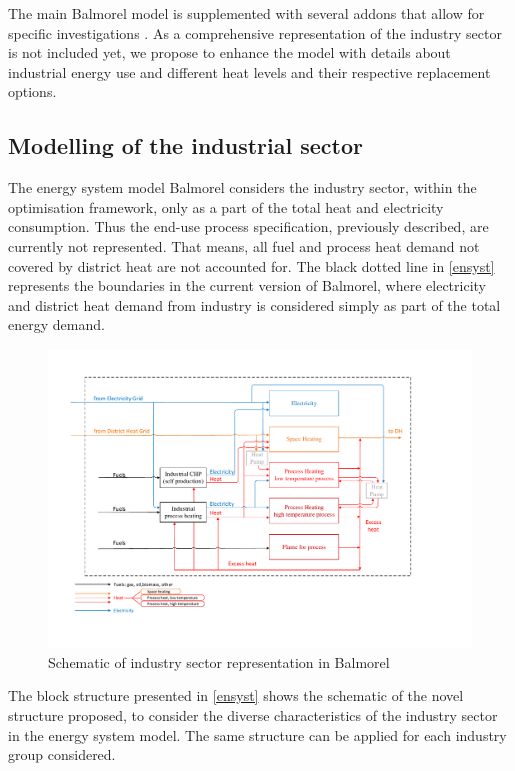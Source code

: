 \documentclass[review]{elsarticle}
\begin{document}
The main Balmorel model is supplemented with several addons that allow for specific investigations \cite{Wiese2018}. As a comprehensive representation of the industry sector is not included yet, we propose to enhance the model with details about industrial energy use and different heat levels and their respective replacement options.

\subsection{Modelling of the industrial sector}

The energy system model Balmorel considers the industry sector, within the optimisation framework, only as a part of the total heat and electricity consumption. Thus the end-use process specification, previously described, are currently not represented. That means, all fuel and process heat demand not covered by district heat are not accounted for. The black dotted line in \autoref{ensyst} represents the boundaries in the current version of Balmorel, where electricity and district heat demand from industry is considered simply as part of the total energy demand. 

\begin{figure}[H]
\centering
\includegraphics[width=\linewidth]{Img/ind_model/IndustryEnergyFlowchart.pdf}
\caption{Schematic of industry sector representation in Balmorel}
\label{ensyst} 
\end{figure}

The block structure presented in \autoref{ensyst} shows the schematic of the novel structure proposed, to consider the diverse characteristics of the industry sector in the energy system model. The same structure can be applied for each industry group considered. 
\end{document}
